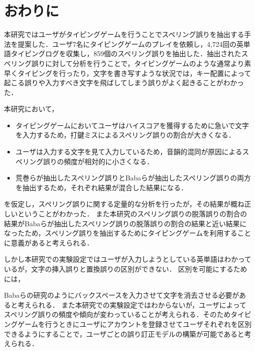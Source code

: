 \chapter{おわりに}
本研究ではユーザがタイピングゲームを行うことでスペリング誤りを抽出する手法を提案した．ユーザ7名にタイピングゲームのプレイを依頼し，4,724回の英単語タイピングログを収集し，859個のスペリング誤りを抽出した．抽出されたスペリング誤りに対して分析を行うことで，タイピングゲームのような通常より素早くタイピングを行ったり，文字を書き写すような状況では，キー配置によって起こる誤りや入力すべき文字を飛ばしてしまう誤りがよく起きることがわかった．

本研究において，

\begin{itemize}
 \item タイピングゲームにおいてユーザはハイスコアを獲得するために急いで文字を入力するため，打鍵ミスによるスペリング誤りの割合が大きくなる．
 \item ユーザは入力する文字を見て入力しているため，音韻的混同が原因によるスペリング誤りの頻度が相対的に小さくなる．
 \item 荒巻らが抽出したスペリング誤り\cite{aramakiNLP2010}とBabaらが抽出したスペリング誤り\cite{babaACL2012}の両方を抽出するため，それぞれ結果が混合した結果になる．
\end{itemize}

を仮定し，スペリング誤りに関する定量的な分析を行ったが，その結果が概ね正しいということがわかった．
また本研究のスペリング誤りの脱落誤りの割合の結果がBabaらが抽出したスペリング誤りの脱落誤りの割合の結果\cite{babaACL2012}と近い結果になったため，スペリング誤りを抽出するためにタイピングゲームを利用することに意義があると考えられる．

しかし本研究での実験設定ではユーザが入力しようとしている英単語はわかっているが，文字の挿入誤りと置換誤りの区別ができない．
区別を可能にするためには，
\begin{comment}
タイピングゲームにおいて入力した文字列が正しいかどうか判定するときにエンターキーを入力させて英単語に対応する文字列を明確にする，
\end{comment}
Babaらの研究\cite{babaACL2012}のようにバックスペースを入力させて文字を消去させる必要があると考えられる．
また本研究での実験設定ではわからないが，ユーザによってスペリング誤りの頻度や傾向が変わっていることが考えられる．そのためタイピングゲームを行うときにユーザにアカウントを登録させてユーザそれぞれを区別できるようにすることで，ユーザごとの誤り訂正モデルの構築が可能であると考えられる．

